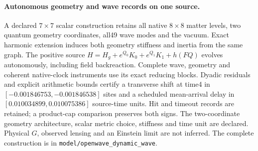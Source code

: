 \paragraph{Autonomous geometry and wave records on one source.}
A declared $7\times7$ scalar construction retains all native $8\times8$
matter levels, two quantum geometry coordinates, all49 wave modes and
the vacuum. Exact harmonic extension induces both geometry stiffness and
inertia from the same graph. The positive source
$H=H_g+e^{Q_0}K_0+e^{Q_1}K_1+h(FQ)$ evolves autonomously, including field
backreaction. Complete wave, geometry and coherent native-clock instruments
use its exact reducing blocks. Dyadic residuals and explicit arithmetic
bounds certify a transverse shift at time4 in
$[-0.001846753,-0.001846538]$ sites and a scheduled mean-arrival delay in
$[0.010034899,0.010075386]$ source-time units. Hit and timeout records are
retained; a product-cap comparison preserves both signs. The two-coordinate
geometry architecture, scalar metric choice, stiffness and time unit are
declared. Physical $G$, observed lensing and an Einstein limit are not
inferred. The complete construction is in
\texttt{model/openwave\_dynamic\_wave}.
